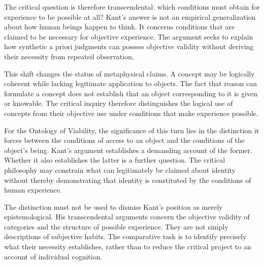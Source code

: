 \label{para:VS.B01.P01.C08.S10.SS03.P002}

The critical question is therefore transcendental:
which conditions must obtain for experience to be
possible at all? Kant's answer is not an empirical
generalization about how human beings happen to think.
It concerns conditions that are claimed to be necessary
for objective experience. The argument seeks to explain
how synthetic a priori judgments can possess objective
validity without deriving their necessity from repeated
observation.

\label{para:VS.B01.P01.C08.S10.SS03.P003}

This shift changes the status of metaphysical claims.
A concept may be logically coherent while lacking
legitimate application to objects. The fact that reason
can formulate a concept does not establish that an
object corresponding to it is given or knowable.
The critical inquiry therefore distinguishes the
logical use of concepts from their objective use
under conditions that make experience possible.

\label{para:VS.B01.P01.C08.S10.SS03.P004}

For the Ontology of Viability, the significance of
this turn lies in the distinction it forces between
the conditions of access to an object and the conditions
of the object's being. Kant's argument establishes
a demanding account of the former. Whether it also
establishes the latter is a further question. The
critical philosophy may constrain what can legitimately
be claimed about identity without thereby demonstrating
that identity is constituted by the conditions of
human experience.

\label{para:VS.B01.P01.C08.SS03.P005}

The distinction must not be used to dismiss Kant's
position as merely epistemological. His transcendental
arguments concern the objective validity of categories
and the structure of possible experience. They are
not simply descriptions of subjective habits. The
comparative task is to identify precisely what their
necessity establishes, rather than to reduce the
critical project to an account of individual cognition.




